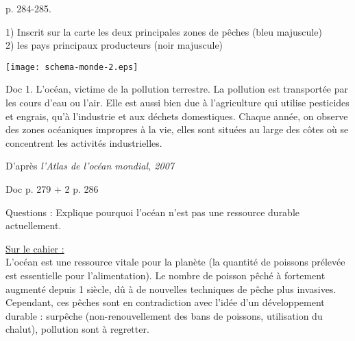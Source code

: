 \documentclass{beamer}
\begin{document}
\begin{frame}
p. 284-285.

 \begin{minipage}{3cm}
 1) Inscrit sur la carte les deux principales zones de pêches (bleu majuscule)\\
 2) les pays principaux producteurs (noir majuscule)
 \end{minipage}
 \begin{minipage}{6cm}
 \texttt{[image: schema-monde-2.eps]}
 \end{minipage}

\end{frame}




\begin{frame} 
\begin{beamerboxesrounded}[scheme=blocimage]{Doc 1. L'océan, victime de la pollution terrestre.} 
La pollution est transportée par les cours d'eau ou l'air. Elle est aussi bien due à l'agriculture qui utilise pesticides et engrais, qu'à l'industrie et aux déchets domestiques. Chaque année, on observe des zones océaniques impropres à la vie, elles sont situées au large des côtes où se concentrent les activités industrielles.
\begin{flushright}
D'après \textit{l'Atlas de l'océan mondial, 2007}
\end{flushright}
\end{beamerboxesrounded}
\vfill
\begin{beamerboxesrounded}[scheme=blocimage]{Doc p. 279 + 2 p. 286} 

\end{beamerboxesrounded}
\end{frame}

\begin{frame}
Questions : 
Explique pourquoi l'océan n'est pas une ressource durable actuellement.\\

\end{frame}

\begin{frame}
\underline{Sur le cahier :} \\
L'océan est une ressource vitale pour la planète (la quantité de poissons prélevée est essentielle pour l'alimentation). Le nombre de poisson pêché à fortement augmenté depuis 1 siècle, dû à de nouvelles techniques de pêche plus invasives. Cependant, ces pêches sont en contradiction avec l'idée d'un développement durable : surpêche (non-renouvellement des bans de poissons, utilisation du chalut), pollution sont à regretter.
\end{frame}
 
\end{document}
